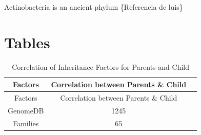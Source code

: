 \documentclass[12pt,twoside]{reedthesis}
\begin{document}
  Actinobacteria is an ancient phylum \{Referencia de luis\}
  
  \section{Tables}\label{tables-1}
  
  \begin{longtable}[c]{@{}ccl@{}}
  \caption{Correlation of Inheritance Factors for Parents and Child
  \label{tab:inher}}\tabularnewline
  \toprule
  \begin{minipage}[b]{0.29\columnwidth}\centering\strut
  Factors
  \strut\end{minipage} &
  \begin{minipage}[b]{0.47\columnwidth}\centering\strut
  Correlation between Parents \& Child
  \strut\end{minipage} &
  \begin{minipage}[b]{0.16\columnwidth}\raggedright\strut
  \strut\end{minipage}\tabularnewline
  \midrule
  \endfirsthead
  \toprule
  \begin{minipage}[b]{0.29\columnwidth}\centering\strut
  Factors
  \strut\end{minipage} &
  \begin{minipage}[b]{0.47\columnwidth}\centering\strut
  Correlation between Parents \& Child
  \strut\end{minipage} &
  \begin{minipage}[b]{0.16\columnwidth}\raggedright\strut
  \strut\end{minipage}\tabularnewline
  \midrule
  \endhead
  \begin{minipage}[t]{0.29\columnwidth}\centering\strut
  GenomeDB
  \strut\end{minipage} &
  \begin{minipage}[t]{0.47\columnwidth}\centering\strut
  1245
  \strut\end{minipage} &
  \begin{minipage}[t]{0.16\columnwidth}\raggedright\strut
  \strut\end{minipage}\tabularnewline
  \begin{minipage}[t]{0.29\columnwidth}\centering\strut
  Families
  \strut\end{minipage} &
  \begin{minipage}[t]{0.47\columnwidth}\centering\strut
  65
  \strut\end{minipage} &
  \begin{minipage}[t]{0.16\columnwidth}\raggedright\strut
  \strut\end{minipage}\tabularnewline
  \bottomrule
  \end{longtable}
  
\end{document}
